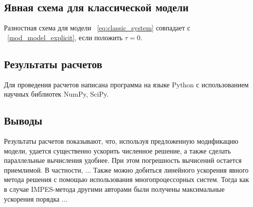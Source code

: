 \subsection{Явная схема для классической модели}
\label{classic_model_explicit}
Разностная схема для модели ~\ref{eq:classic_system} совпадает с ~\ref{mod_model_explicit}, если положить $\tau=0$.

\subsection{Результаты расчетов}
\label{calc_results}
Для проведения расчетов написана программа на языке Python с использованием научных библиотек NumPy, SciPy.

\subsection{Выводы}
\label{calc_conclusions}
Результаты расчетов показывают, что, используя предложенную модификацию модели, удается существенно ускорить
численное решение, а также сделать параллельные вычисления удобнее. При этом погрешность вычисений остается
приемлимой. В частности, ... 
Также можно добиться линейного ускорения явного метода решения с помощью использования многопроцессорных систем. 
Тогда как в случае IMPES-метода другими авторами были получены максимальные ускорения порядка ...
